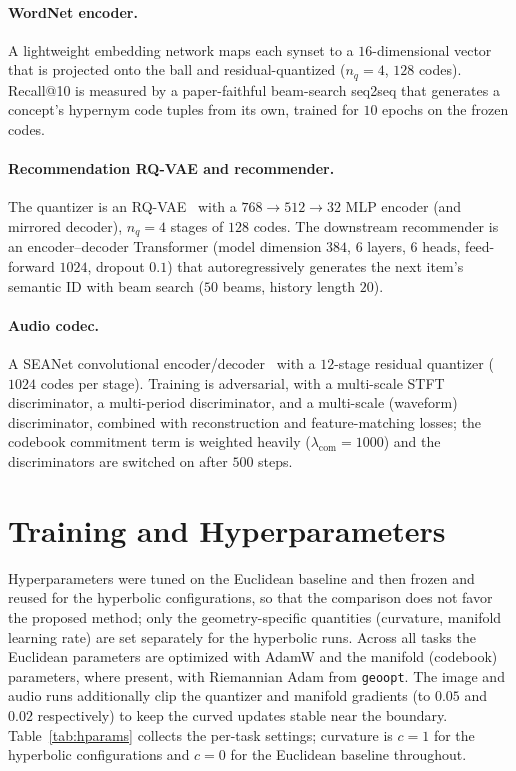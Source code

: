 \documentclass[12pt]{report}
\begin{document}
\paragraph{WordNet encoder.} A lightweight embedding network maps each synset to a $16$-dimensional vector that is projected onto the ball and residual-quantized ($n_q=4$, $128$ codes). Recall@10 is measured by a paper-faithful beam-search seq2seq that generates a concept's hypernym code tuples from its own, trained for $10$ epochs on the frozen codes.

\paragraph{Recommendation RQ-VAE and recommender.} The quantizer is an RQ-VAE~\cite{lee2022rqvae,hrqvae} with a $768\!\to\!512\!\to\!32$ MLP encoder (and mirrored decoder), $n_q=4$ stages of $128$ codes. The downstream recommender is an encoder--decoder Transformer (model dimension $384$, $6$ layers, $6$ heads, feed-forward $1024$, dropout $0.1$) that autoregressively generates the next item's semantic ID with beam search ($50$ beams, history length $20$).

\paragraph{Audio codec.} A SEANet convolutional encoder/decoder~\cite{soundstream,encodec} with a $12$-stage residual quantizer ($1024$ codes per stage). Training is adversarial, with a multi-scale STFT discriminator, a multi-period discriminator, and a multi-scale (waveform) discriminator, combined with reconstruction and feature-matching losses; the codebook commitment term is weighted heavily ($\lambda_{\text{com}}=1000$) and the discriminators are switched on after $500$ steps.

\section{Training and Hyperparameters}
\label{sec:hparams}

Hyperparameters were tuned on the Euclidean baseline and then frozen and reused for the hyperbolic configurations, so that the comparison does not favor the proposed method; only the geometry-specific quantities (curvature, manifold learning rate) are set separately for the hyperbolic runs. Across all tasks the Euclidean parameters are optimized with AdamW and the manifold (codebook) parameters, where present, with Riemannian Adam from \texttt{geoopt}. The image and audio runs additionally clip the quantizer and manifold gradients (to $0.05$ and $0.02$ respectively) to keep the curved updates stable near the boundary. Table~\ref{tab:hparams} collects the per-task settings; curvature is $c=1$ for the hyperbolic configurations and $c=0$ for the Euclidean baseline throughout.
\end{document}
